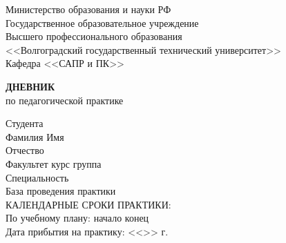 \documentclass[a4paper, 14pt]{extreport}
\begin{document}
    \begin{titlepage}
        \begin{center}
            Министерство образования и науки РФ \\
            Государственное образовательное учреждение\\
            Высшего профессионального образования\\
            <<Волгоградский государственный технический университет>>\\
            Кафедра <<САПР и ПК>>
        \end{center}
        \vspace{2cm}
        \begin{center}
            \large \textbf{ДНЕВНИК} \\
            по педагогической практике
        \end{center}
        \begin{flushleft}
            Студента\\
            Фамилия \underline{\hspace{5cm}} 
            Имя \underline{\hspace{5.1cm}}\\
            Отчество \underline{\hspace{5cm}}\\
            Факультет \underline{\hspace{4.8cm}} курс \underline{\hspace{2cm}} 
            группа \underline{\hspace{4cm}}\\
            \vspace{1cm}
            Специальность \underline{\hspace{12.8cm}}\\
            База проведения практики \underline{\hspace{10.4cm}}\\
            \vspace{1cm}
            КАЛЕНДАРНЫЕ СРОКИ ПРАКТИКИ:\\
            По учебному плану: \hspace{0.5cm} начало \underline{\hspace{4cm}} 
            конец \underline{\hspace{4cm}}\\
            Дата прибытия на практику: <<\underline{\hspace{1cm}}>> \underline{\hspace{3cm}} \the\year г.\\

\end{flushleft}
\end{titlepage}
\end{document}

